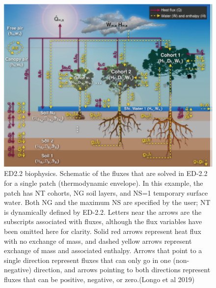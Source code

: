 \documentclass[
  12pt,
  oneside]{book}
\begin{document}
\begin{figure}

{\centering \includegraphics[width=0.8\linewidth]{figures/chap6/f616_ED_biophysics} 

}

\caption{ED2.2 biophysics. Schematic of the fluxes that are solved in ED-2.2 for a single patch (thermodynamic envelope). In this example, the patch has NT cohorts, NG soil layers, and NS=1 temporary surface water. Both NG and the maximum NS are specified by the user; NT is dynamically defined by ED-2.2. Letters near the arrows are the subscripts associated with fluxes, although the flux variables have been omitted here for clarity. Solid red arrows represent heat flux with no exchange of mass, and dashed yellow arrows represent exchange of mass and associated enthalpy. Arrows that point to a single direction represent fluxes that can only go in one (non-negative) direction, and arrows pointing to both directions represent fluxes that can be positive, negative, or zero.(Longo et al 2019)}\label{fig:f616}
\end{figure}
\end{document}
